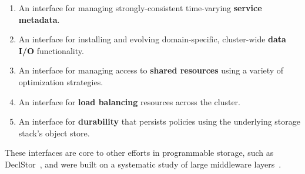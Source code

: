 \begin{enumerate}

\item An interface for managing strongly-consistent time-varying
\textbf{service metadata}.

\item An interface for installing and evolving domain-specific, cluster-wide
\textbf{data I/O} functionality.

\item An interface for managing access to \textbf{shared resources} using a
variety of optimization strategies.

\item An interface for \textbf{load balancing} resources across the cluster.

\item An interface for \textbf{durability} that persists policies using the
underlying storage stack's object store.

\end{enumerate}

These interfaces are core to other efforts in programmable storage, such as
DeclStor~\cite{watkins:hot17-declstor, watkins:techreport16-brados}, and were
built on a systematic study of large middleware
layers~\cite{watkins_invivo_2013, watkins:scc2012-datamods}.
